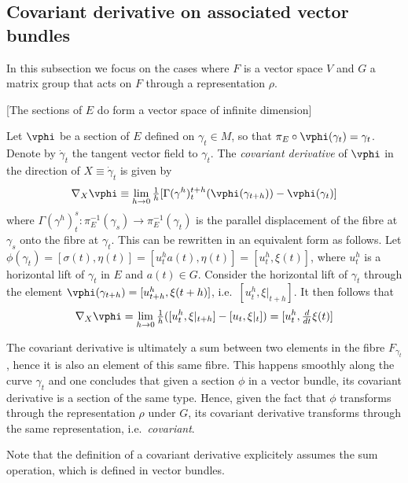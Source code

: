 \documentclass[10pt,reqno]{amsart}
\numberwithin{equation}{section}
\begin{document}
\subsection{Covariant derivative on associated vector bundles}

In this subsection we focus on the cases where $F$ is a vector 
space $V$ and $G$ a matrix group that acts on $F$ through a 
representation $\rho$.

[The sections of $E$ do form a vector space of infinite 
dimension]

Let $\vphi$ be a section of $E$ defined on $\gamma_t \in M$, so 
that $\pi_E \circ \vphi(\gamma_t) = \gamma_t$. Denote by 
$\dot{\gamma}_t$ the tangent vector field to $\gamma_t$. The 
\emph{covariant derivative} of $\vphi$ in the direction of $X 
\equiv \dot{\gamma}_t$ is given by
%
\begin{equation}
	\nabla_{X} \vphi \equiv \lim_{h \rightarrow 0}
	\tfrac{1}{h}[ \Gamma(\gamma^h)^{t+h}_t (\vphi(\gamma_{t+h}))
	- \vphi(\gamma_t) ]
\end{equation}
%
where $\Gamma(\gamma^h)^s_t : \pi^{-1}_E(\gamma_s) \rightarrow 
\pi^{-1}_E(\gamma_t)$ is the parallel displacement of the fibre 
at $\gamma_s$ onto the fibre at $\gamma_t$. This can be rewritten 
in an equivalent form as follows. Let $\phi(\gamma_t) = 
[\sigma(t), \eta(t)] = [u^h_t a(t), \eta(t)] = [u^h_t, \xi(t)]$, 
where $u^h_t$ is a horizontal lift of $\gamma_t$ in $E$ and $a(t) 
\in G$. Consider the horizontal lift of $\gamma_t$ through the 
element $\vphi(\gamma_{t+h}) = [u^h_{t+h}, \xi(t+h)]$, i.e.\ 
$[u^h_t, \xi|_{t+h}]$. It then follows that
%
\begin{displaymath}
	\nabla_X \vphi = \lim_{h \rightarrow 0} \tfrac{1}{h} ([u^h_t, 
	\xi|_{t+h}] - [u_t, \xi|_t]) = [u^h_t, \tfrac{d}{dt} \xi(t)]
\end{displaymath}

The covariant derivative is ultimately a sum between two elements 
in the fibre $F_{\gamma_t}$, hence it is also an element of this 
same fibre. This happens smoothly along the curve $\gamma_t$ and 
one concludes that given a section $\phi$ in a vector bundle, its 
covariant derivative is a section of the same type. Hence, given 
the fact that $\phi$ transforms through the representation $\rho$ 
under $G$, its covariant derivative transforms through the same 
representation, i.e.\ \emph{covariant}.

Note that the definition of a covariant derivative explicitely 
assumes the sum operation, which is defined in vector bundles.
\end{document}

